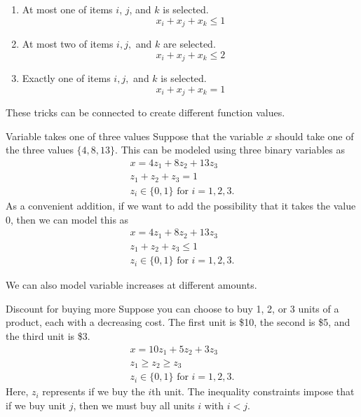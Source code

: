 \begin{enumerate}
\item At most one of items $i$, $j$, and $k$ is selected.
 \begin{equation}
 x_i + x_j + x_k \leq 1
 \end{equation}
\item At most two of items $i,j,$ and $k$ are selected.
 \begin{equation}
 x_i + x_j + x_k \leq 2
 \end{equation}
\item Exactly one of items $i,j,$ and $k$ is selected.
 \begin{equation}
  x_i + x_j + x_k = 1
 \end{equation}
\end{enumerate}

These tricks can be connected to create different function values.  

\begin{example}{Variable takes one of three values}{}
Suppose that the variable $x$ should take one of the three values $\{4, 8, 13\}$. This can be modeled using three binary variables as
\begin{align*}
x=4z_1 +8z_2 +13z_3\\
 z_1 +z_2 +z_3 =1\\
z_i \in \{0, 1\} \text{ for } i = 1, 2,3.
\end{align*}
As a convenient addition, if we want to add the possibility that it takes the value $0$, then we can model this as 
\begin{align*}
x=4z_1 +8z_2 +13z_3\\
 z_1 +z_2 +z_3 \leq 1\\
z_i \in \{0, 1\} \text{ for } i = 1, 2,3.
\end{align*}
\end{example}


We can also model variable increases at different amounts.  \begin{example}{Discount for buying more}{}
Suppose you can choose to buy 1, 2, or 3 units of a product, each with a decreasing cost.  The first unit is \$10, the second is \$5, and the third unit is \$3.
\begin{align*}
x=10z_1 +5z_2 +3z_3\\
 z_1\geq z_2 \geq z_3\\
z_i \in \{0, 1\} \text{ for } i = 1, 2,3.
\end{align*}
Here, $z_i$ represents if we buy the $i$th unit.  The inequality constraints impose that if we buy unit $j$, then we must buy all units $i$ with $i < j$.
\end{example}


